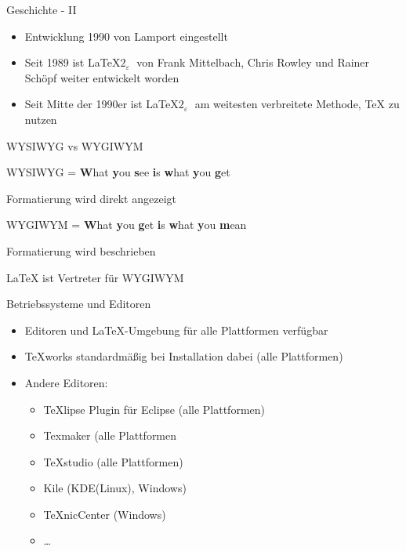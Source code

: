 \documentclass{beamer}
\begin{document}
\begin{frame}{Geschichte - II}
\begin{itemize}
\item Entwicklung 1990 von Lamport eingestellt
\item Seit 1989 ist \LaTeX $2_{\varepsilon}\;$ von Frank Mittelbach, Chris Rowley und Rainer Schöpf weiter entwickelt worden
\item Seit Mitte der 1990er ist \LaTeX $2_{\varepsilon}\;$ am weitesten verbreitete Methode, \TeX\; zu nutzen
\end{itemize}
\end{frame}

\begin{frame}{WYSIWYG vs WYGIWYM}

\begin{block}{WYSIWYG}
= \textbf{W}hat \textbf{y}ou \textbf{s}ee \textbf{i}s \textbf{w}hat \textbf{y}ou \textbf{g}et

Formatierung wird direkt angezeigt
\end{block}

\begin{block}{WYGIWYM}
= \textbf{W}hat \textbf{y}ou \textbf{g}et \textbf{i}s \textbf{w}hat \textbf{y}ou \textbf{m}ean

Formatierung wird beschrieben
\end{block}

\LaTeX \; ist Vertreter für WYGIWYM

\end{frame}

\begin{frame}{Betriebssysteme und Editoren}

\begin{itemize}
\item Editoren und \LaTeX-Umgebung für alle Plattformen verfügbar
\item TeXworks standardmäßig bei Installation dabei (alle Plattformen)
\item Andere Editoren: 
	\begin{itemize}
	\item TeXlipse Plugin für Eclipse (alle Plattformen)
	\item Texmaker (alle Plattformen
	\item TeXstudio (alle Plattformen)
	\item Kile (KDE(Linux), Windows)
	\item TeXnicCenter (Windows)
	\item \ldots
	\end{itemize}
\end{itemize}

\end{frame}
\end{document}
